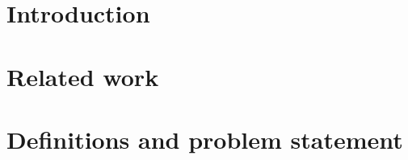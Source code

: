 \documentclass{article}
\begin{document}

\clearpage
\section{Introduction}

\section{Related work}

\section{Definitions and problem statement}\label{sec:pf}



\end{document}
